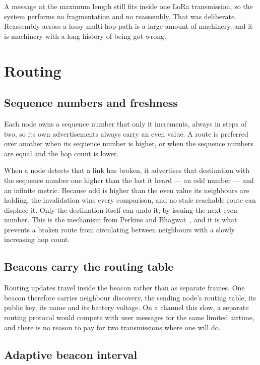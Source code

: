 \documentclass[12pt,a4paper,oneside]{report}
\begin{document}
A message at the maximum length still fits inside one LoRa transmission, so the
system performs no fragmentation and no reassembly. That was deliberate.
Reassembly across a lossy multi-hop path is a large amount of machinery, and it
is machinery with a long history of being got wrong.

\section{Routing}

\subsection{Sequence numbers and freshness}

Each node owns a sequence number that only it increments, always in steps of two,
so its own advertisements always carry an even value. A route is preferred over
another when its sequence number is higher, or when the sequence numbers are
equal and the hop count is lower.

When a node detects that a link has broken, it advertises that destination with
the sequence number one higher than the last it heard --- an odd number --- and
an infinite metric. Because odd is higher than the even value its neighbours are
holding, the invalidation wins every comparison, and no stale reachable route can
displace it. Only the destination itself can undo it, by issuing the next even
number. This is the mechanism from Perkins and
Bhagwat~\cite{perkins1994dsdv}, and it is what prevents a broken route from
circulating between neighbours with a slowly increasing hop count.

\subsection{Beacons carry the routing table}

Routing updates travel inside the beacon rather than as separate frames. One
beacon therefore carries neighbour discovery, the sending node's routing table,
its public key, its name and its battery voltage. On a channel this slow, a
separate routing protocol would compete with user messages for the same limited
airtime, and there is no reason to pay for two transmissions where one will do.

\subsection{Adaptive beacon interval}
\end{document}
